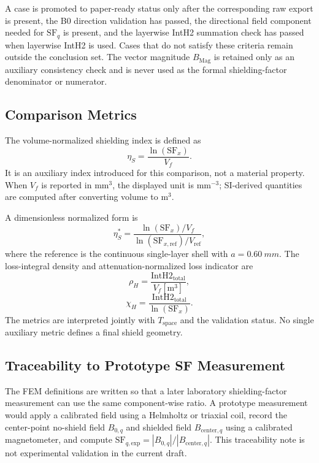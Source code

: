 ﻿\documentclass[letterpaper,journal]{IEEEtran}
\begin{document}
A case is promoted to paper-ready status only after the corresponding raw export is present, the B0 direction validation has passed, the directional field component needed for $\mathrm{SF}_q$ is present, and the layerwise IntH2 summation check has passed when layerwise IntH2 is used. Cases that do not satisfy these criteria remain outside the conclusion set. The vector magnitude $B_{\mathrm{Mag}}$ is retained only as an auxiliary consistency check and is never used as the formal shielding-factor denominator or numerator.

\subsection{Comparison Metrics}

The volume-normalized shielding index is defined as
\begin{equation}
\eta_S=\frac{\ln(\mathrm{SF}_x)}{V_f}.
\label{eq:etas}
\end{equation}
It is an auxiliary index introduced for this comparison, not a material property. When $V_f$ is reported in $\mathrm{mm^3}$, the displayed unit is $\mathrm{mm^{-3}}$; SI-derived quantities are computed after converting volume to $\mathrm{m^3}$.

A dimensionless normalized form is
\begin{equation}
\eta_S^*=
\frac{\ln(\mathrm{SF}_x)/V_f}{\ln(\mathrm{SF}_{x,\mathrm{ref}})/V_{\mathrm{ref}}},
\label{eq:etasstar}
\end{equation}
where the reference is the continuous single-layer shell with $a=\SI{0.60}{mm}$. The loss-integral density and attenuation-normalized loss indicator are
\begin{equation}
\rho_H=\frac{\mathrm{IntH2}_{\mathrm{total}}}{V_f[\mathrm{m^3}]},
\label{eq:rhoh}
\end{equation}
\begin{equation}
\chi_H=\frac{\mathrm{IntH2}_{\mathrm{total}}}{\ln(\mathrm{SF}_x)}.
\label{eq:chih}
\end{equation}
The metrics are interpreted jointly with $T_{\mathrm{space}}$ and the validation status. No single auxiliary metric defines a final shield geometry.

\subsection{Traceability to Prototype SF Measurement}

The FEM definitions are written so that a later laboratory shielding-factor measurement can use the same component-wise ratio. A prototype measurement would apply a calibrated field using a Helmholtz or triaxial coil, record the center-point no-shield field $B_{0,q}$ and shielded field $B_{\mathrm{center},q}$ using a calibrated magnetometer, and compute $\mathrm{SF}_{q,\mathrm{exp}}=|B_{0,q}|/|B_{\mathrm{center},q}|$. This traceability note is not experimental validation in the current draft.
\end{document}
